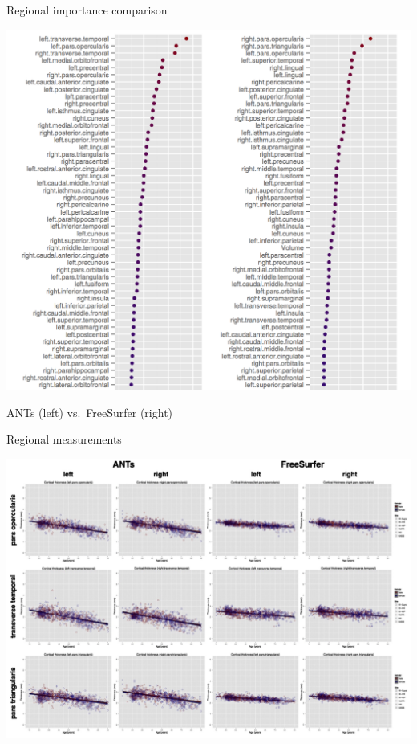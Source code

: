 \documentclass[ignorenonframetext,]{beamer}
\begin{document}
\begin{frame}{Regional importance comparison}

\includegraphics{./evaluation/figures/antsvfreesurfer_Importance.png}

ANTs (left) vs.~FreeSurfer (right)

\end{frame}

\begin{frame}{Regional measurements}

\includegraphics{./evaluation/figures/antsvfreesurfer_regionalPlots.png}

\hypertarget{refs}{}

\end{frame}
\end{document}
